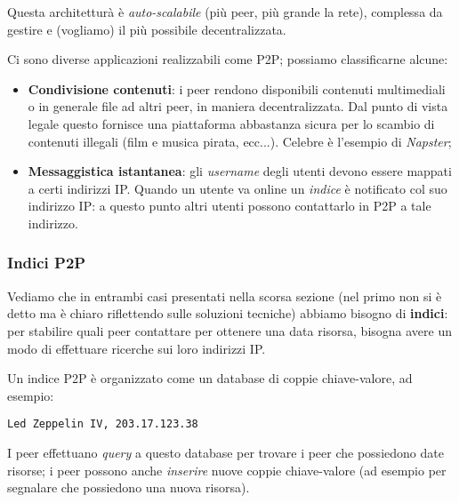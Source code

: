 \documentclass[a4paper,11pt]{article}
\begin{document}
Questa architetturà è \textit{auto-scalabile} (più peer, più grande la rete), complessa da gestire e (vogliamo) il più possibile decentralizzata.

Ci sono diverse applicazioni realizzabili come P2P; possiamo classificarne alcune:
\begin{itemize}
	\item \textbf{Condivisione contenuti}: i peer rendono disponibili contenuti multimediali o in generale file ad altri peer, in maniera decentralizzata. Dal punto di vista legale questo fornisce una piattaforma abbastanza sicura per lo scambio di contenuti illegali (film e musica pirata, ecc...). Celebre è l'esempio di \textit{Napster};
	\item \textbf{Messaggistica istantanea}: gli \textit{username} degli utenti devono essere mappati a certi indirizzi IP. Quando un utente va online un \textit{indice} è notificato col suo indirizzo IP: a questo punto altri utenti possono contattarlo in P2P a tale indirizzo.
\end{itemize}

\subsubsection{Indici P2P}
Vediamo che in entrambi casi presentati nella scorsa sezione (nel primo non si è detto ma è chiaro riflettendo sulle soluzioni tecniche) abbiamo bisogno di \textbf{indici}: per stabilire quali peer contattare per ottenere una data risorsa, bisogna avere un modo di effettuare ricerche sui loro indirizzi IP.

Un indice P2P è organizzato come un database di coppie chiave-valore, ad esempio:
\begin{lstlisting}[style=shellstyle]
Led Zeppelin IV, 203.17.123.38
\end{lstlisting}

I peer effettuano \textit{query} a questo database per trovare i peer che possiedono date risorse; i peer possono anche \textit{inserire} nuove coppie chiave-valore (ad esempio per segnalare che possiedono una nuova risorsa).
\end{document}
